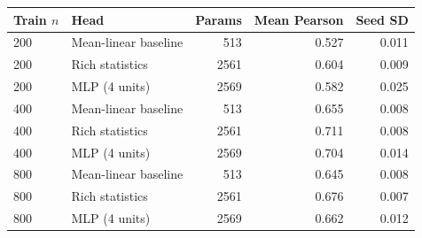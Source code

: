 \begin{tabular}{llrrr}
\toprule
Train $n$ & Head & Params & Mean Pearson & Seed SD \\
\midrule
200 & Mean-linear baseline & 513 & 0.527 & 0.011 \\
200 & Rich statistics & 2561 & 0.604 & 0.009 \\
200 & MLP (4 units) & 2569 & 0.582 & 0.025 \\
400 & Mean-linear baseline & 513 & 0.655 & 0.008 \\
400 & Rich statistics & 2561 & 0.711 & 0.008 \\
400 & MLP (4 units) & 2569 & 0.704 & 0.014 \\
800 & Mean-linear baseline & 513 & 0.645 & 0.008 \\
800 & Rich statistics & 2561 & 0.676 & 0.007 \\
800 & MLP (4 units) & 2569 & 0.662 & 0.012 \\
\bottomrule
\end{tabular}

